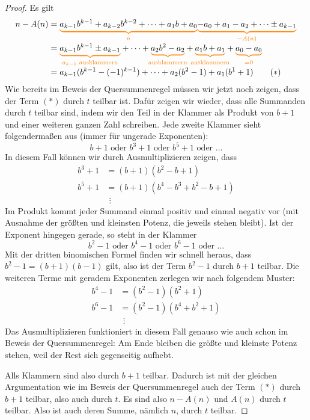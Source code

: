 \documentclass[../../main.tex]{subfiles}
\begin{document}
\begin{proof}
    Es gilt
    \begin{align*}
        n-A(n)&=\colorbrace{a_{k-1}b^{k-1}+a_{k-2}b^{k-2}+\cdots+a_1b+a_0}{n}\colorbrace{-a_0+a_1-a_2+\cdots\pm a_{k-1}}{-A(n)}\\
        &=\colorbrace{a_{k-1}b^{k-1}\pm a_{k-1}}{a_{k-1}\text{ ausklammern}}+\dots+\colorbrace{a_2b^2-a_2}{\text{ausklammern}}+\colorbrace{a_1b+a_1}{\text{ausklammern}}+\colorbrace{a_0-a_0}{=0}\\
        &=a_{k-1}(b^{k-1}-(-1)^{k-1})+\dots+a_2(b^2-1)+a_1(b^1+1)\tag{$*$}
    \end{align*}
    Wie bereits im Beweis der Quersummenregel müssen wir jetzt noch zeigen, dass der Term $(*)$ durch $t$ teilbar ist. Dafür zeigen wir wieder, dass alle Summanden durch $t$ teilbar sind, indem wir den Teil in der Klammer als Produkt von $b+1$ und einer weiteren ganzen Zahl schreiben. Jede zweite Klammer sieht folgendermaßen aus (immer für ungerade Exponenten):
    \[b+1\text{ oder }b^3+1\text{ oder }b^5+1\text{ oder }\dots\]
    In diesem Fall können wir durch Ausmultiplizieren zeigen, dass 
    \begin{align*}
        b^3+1&=(b+1)(b^2-b+1)\\
        b^5+1&=(b+1)(b^4-b^3+b^2-b+1)\\
        &~\,\vdots
    \end{align*}
    Im Produkt kommt jeder Summand einmal positiv und einmal negativ vor (mit Ausnahme der größten und kleinsten Potenz, die jeweils stehen bleibt). Ist der Exponent hingegen gerade, so steht in der Klammer
    \[b^2-1\text{ oder }b^4-1\text{ oder }b^6-1\text{ oder }\dots\]
    Mit der dritten binomischen Formel finden wir schnell heraus, dass $b^2-1=(b+1)(b-1)$ gilt, also ist der Term $b^2-1$ durch $b+1$ teilbar. Die weiteren Terme mit geradem Exponenten zerlegen wir nach folgendem Muster:
    \begin{align*}
        b^4-1&=(b^2-1)(b^2+1)\\
        b^6-1&=(b^2-1)(b^4+b^2+1)\\
        &~\,\vdots
    \end{align*}
    Das Ausmultiplizieren funktioniert in diesem Fall genauso wie auch schon im Beweis der Quersummenregel: Am Ende bleiben die größte und kleinste Potenz stehen, weil der Rest sich gegenseitig aufhebt.

    Alls Klammern sind also durch $b+1$ teilbar. Dadurch ist mit der gleichen Argumentation wie im Beweis der Quersummenregel auch der Term $(*)$ durch $b+1$ teilbar, also auch durch $t$. Es sind also $n-A(n)$ und $A(n)$ durch $t$ teilbar. Also ist auch deren Summe, nämlich $n$, durch $t$ teilbar.
\end{proof}
\end{document}
